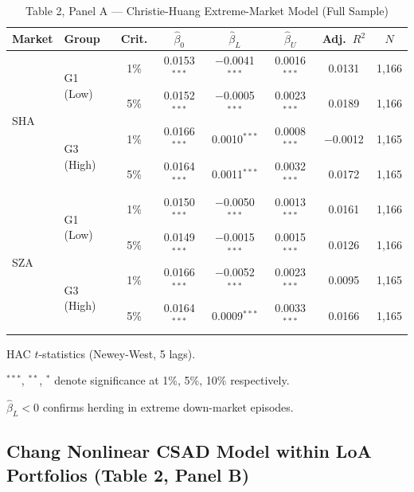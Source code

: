 \documentclass[12pt, a4paper]{article}
\begin{document}
\begin{table}[H]
  \centering
  \caption{Table 2, Panel A — Christie-Huang Extreme-Market Model (Full Sample)}
  \label{tab:ch_model}
  \begin{threeparttable}
  \begin{tabular}{llcccccc}
    \toprule
    Market & Group & Crit. & $\hat\beta_0$ & $\hat\beta_L$ & $\hat\beta_U$ & Adj.~$R^2$ & $N$ \\
    \midrule
    \multirow{4}{*}{SHA}
      & \multirow{2}{*}{G1 (Low)} & 1\% & 0.0153$^{***}$ & $-$0.0041$^{***}$ &  0.0016$^{***}$ & 0.0131 & 1,166 \\
      &                           & 5\% & 0.0152$^{***}$ & $-$0.0005$^{***}$ &  0.0023$^{***}$ & 0.0189 & 1,166 \\
      & \multirow{2}{*}{G3 (High)}& 1\% & 0.0166$^{***}$ &  0.0010$^{***}$ &  0.0008$^{***}$ & $-$0.0012 & 1,165 \\
      &                           & 5\% & 0.0164$^{***}$ &  0.0011$^{***}$ &  0.0032$^{***}$ & 0.0172 & 1,165 \\
    \midrule
    \multirow{4}{*}{SZA}
      & \multirow{2}{*}{G1 (Low)} & 1\% & 0.0150$^{***}$ & $-$0.0050$^{***}$ &  0.0013$^{***}$ & 0.0161 & 1,166 \\
      &                           & 5\% & 0.0149$^{***}$ & $-$0.0015$^{***}$ &  0.0015$^{***}$ & 0.0126 & 1,166 \\
      & \multirow{2}{*}{G3 (High)}& 1\% & 0.0166$^{***}$ & $-$0.0052$^{***}$ &  0.0023$^{***}$ & 0.0095 & 1,165 \\
      &                           & 5\% & 0.0164$^{***}$ &  0.0009$^{***}$ &  0.0033$^{***}$ & 0.0166 & 1,165 \\
    \bottomrule
  \end{tabular}
  \begin{tablenotes}
    \footnotesize
    \item HAC $t$-statistics (Newey-West, 5 lags).
    \item $^{***}$, $^{**}$, $^{*}$ denote significance at 1\%, 5\%, 10\% respectively.
    \item $\hat\beta_L < 0$ confirms herding in extreme down-market episodes.
  \end{tablenotes}
  \end{threeparttable}
\end{table}

\subsection{Chang Nonlinear CSAD Model within LoA Portfolios (Table 2, Panel B)}
\end{document}
